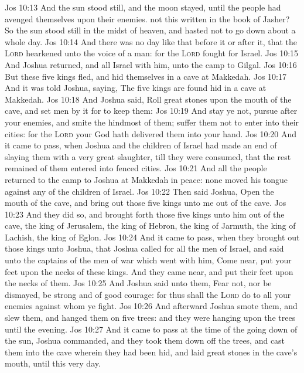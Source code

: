 \vs Jos 10:13 And the sun stood still, and the moon stayed, until the people had avenged themselves upon their enemies.  not this written in the book of Jasher? So the sun stood still in the midst of heaven, and hasted not to go down about a whole day.
\vs Jos 10:14 And there was no day like that before it or after it, that the \textsc{Lord} hearkened unto the voice of a man: for the \textsc{Lord} fought for Israel.
\vs Jos 10:15 And Joshua returned, and all Israel with him, unto the camp to Gilgal.
\vs Jos 10:16 But these five kings fled, and hid themselves in a cave at Makkedah.
\vs Jos 10:17 And it was told Joshua, saying, The five kings are found hid in a cave at Makkedah.
\vs Jos 10:18 And Joshua said, Roll great stones upon the mouth of the cave, and set men by it for to keep them:
\vs Jos 10:19 And stay ye not,  pursue after your enemies, and smite the hindmost of them; suffer them not to enter into their cities: for the \textsc{Lord} your God hath delivered them into your hand.
\vs Jos 10:20 And it came to pass, when Joshua and the children of Israel had made an end of slaying them with a very great slaughter, till they were consumed, that the rest  remained of them entered into fenced cities.
\vs Jos 10:21 And all the people returned to the camp to Joshua at Makkedah in peace: none moved his tongue against any of the children of Israel.
\vs Jos 10:22 Then said Joshua, Open the mouth of the cave, and bring out those five kings unto me out of the cave.
\vs Jos 10:23 And they did so, and brought forth those five kings unto him out of the cave, the king of Jerusalem, the king of Hebron, the king of Jarmuth, the king of Lachish,  the king of Eglon.
\vs Jos 10:24 And it came to pass, when they brought out those kings unto Joshua, that Joshua called for all the men of Israel, and said unto the captains of the men of war which went with him, Come near, put your feet upon the necks of these kings. And they came near, and put their feet upon the necks of them.
\vs Jos 10:25 And Joshua said unto them, Fear not, nor be dismayed, be strong and of good courage: for thus shall the \textsc{Lord} do to all your enemies against whom ye fight.
\vs Jos 10:26 And afterward Joshua smote them, and slew them, and hanged them on five trees: and they were hanging upon the trees until the evening.
\vs Jos 10:27 And it came to pass at the time of the going down of the sun,  Joshua commanded, and they took them down off the trees, and cast them into the cave wherein they had been hid, and laid great stones in the cave's mouth,  until this very day.
